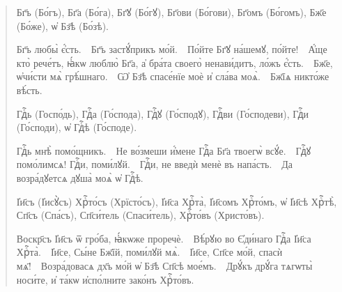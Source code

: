 \documentclass[11pt,a4paper,oneside]{memoir}
\newcommand{\exercise}{}
\newcommand{\exquote}{quote}
\newcommand{\pstyle}{\textenglish}
\newcommand{\pxp}[1]{\pstyle{(}#1\pstyle{)}}
\newcommand{\sdash}{\textenglish{\textemdash}}
\begin{document}
    \begin{\exquote}\begin{slv}
        Бг҃ъ \pxp{Бо́гъ}, Бг҃а \pxp{Бо́га}, Бг҃ꙋ \pxp{Бо́гꙋ}, Бг҃ови \pxp{Бо́гови}, Бг҃омъ \pxp{Бо́гомъ}, Бж҃е \pxp{Бо́же}, ѡ҆ Бз҃ѣ \pxp{Бо́зѣ}.
        
        Бг҃ъ любы̀ є҆́сть.~\sdash~Бг҃ъ застꙋ́прикъ мо́й.~\sdash~По́йте Бг҃ꙋ на́шемꙋ, по́йте!~\sdash~А҆́ще кто̀ рече́тъ, ꙗ҆́кѡ люблю̀ Бг҃а, а҆ бра́та своего̀ ненави́дитъ, ло́жъ є҆́сть.~\sdash~Бж҃е, ѡ҆чи́сти мѧ̀ грѣ́шнаго.~\sdash~Ѡ҆ Бз҃ѣ спасе́нїе моѐ и҆ сла́ва моѧ̀.~\sdash~Бж҃їѧ никто́же вѣ́сть.
        
        Гдⷭ҇ь \pxp{Госпо́дь}, Гдⷭ҇а \pxp{Го́спода}, Гдⷭ҇ꙋ \pxp{Го́сподꙋ}, Гдⷭ҇ви \pxp{Го́сподеви}, Гдⷭ҇и \pxp{Го́споди}, ѡ҆ Гдⷭ҇ѣ \pxp{Го́споде}.
        
        Гдⷭ҇ь мнѣ̀ помо́щникъ.~\sdash~Не во́змеши и҆́мене Гдⷭ҇а Бг҃а твоегѡ̀ всꙋ́е.~\sdash~Гдⷭ҇ꙋ помо́лимсѧ! Гдⷭ҇и, поми́лꙋй.~\sdash~Гдⷭ҇и, не введѝ менѐ въ напа́сть.~\sdash~Да возра́дꙋетсѧ дꙋша̀ моѧ̀ ѡ҆ Гдⷭ҇ѣ.
        
        І҆и҃съ \pxp{І҆исꙋ̀съ} Хрⷭ҇то́съ \pxp{Хрїсто́съ}, І҆и҃са Хрⷭ҇та̀, І҆и҃сомъ Хрⷭ҇то́мъ, ѡ҆ І҆и҃сѣ Хрⷭ҇тѣ̀, Сп҃съ \pxp{Спа́съ}, Сп҃си́тель \pxp{Спаси́тель}, Хрⷭ҇то́въ \pxp{Христо́въ}.
        
        Воскр҃съ І҆и҃съ ѿ гро́ба, ꙗ҆́кѡже проречѐ.~\sdash~Вѣ́рꙋю во Є҆ди́наго Гдⷭ҇а І҆и҃са Хрⷭ҇та̀.~\sdash~І҆и҃се, Сы́не Бж҃їй, поми́лꙋй мѧ̀.~\sdash~І҆и҃се, Сп҃се мо́й, спасѝ мѧ҃!~\sdash~Возра́довасѧ дх҃ъ мо́й ѡ҆ Бз҃ѣ Сп҃сѣ мое́мъ.~\sdash~Дрꙋ́къ дрꙋ́га тѧгѡты̀ носи́те, и҆ та́кѡ и҆спо́лните зако́нъ Хрⷭ҇то́въ.
    \end{slv}\end{\exquote}

                    \paragraph{\exercise}
    
\end{document}
